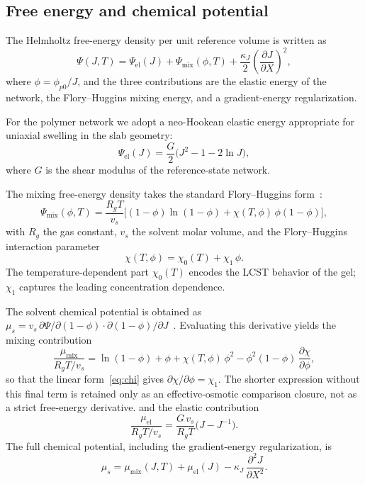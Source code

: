 \documentclass[11pt]{article}
\newcommand{\pp}{\phi_{p0}}
\begin{document}
\subsection{Free energy and chemical potential}

The Helmholtz free-energy density per unit reference volume is written as
\begin{equation}
  \Psi(J,T) = \Psi_\mathrm{el}(J) + \Psi_\mathrm{mix}(\phi,T)
  + \frac{\kappa_J}{2}\left(\frac{\partial J}{\partial X}\right)^2,
  \label{eq:Psi}
\end{equation}
where $\phi = \pp/J$, and the three contributions are the elastic
energy of the network, the Flory--Huggins mixing energy, and a
gradient-energy regularization.

For the polymer network we adopt a neo-Hookean elastic energy
appropriate for uniaxial swelling in the slab geometry:
\begin{equation}
  \Psi_\mathrm{el}(J) = \frac{G}{2}
  \bigl(J^{2} - 1 - 2\ln J\bigr),
  \label{eq:Psi_el}
\end{equation}
where $G$ is the shear modulus of the reference-state network.

The mixing free-energy density takes the standard Flory--Huggins
form~\cite{Flory1953}:
\begin{equation}
  \Psi_\mathrm{mix}(\phi,T)
  = \frac{R_g T}{v_s}
  \Big[(1-\phi)\ln(1-\phi) + \chi(T,\phi)\,\phi(1-\phi)\Big],
  \label{eq:Psi_mix}
\end{equation}
with $R_g$ the gas constant, $v_s$ the solvent molar volume, and
the Flory--Huggins interaction parameter
\begin{equation}
  \chi(T,\phi) = \chi_0(T) + \chi_1\,\phi.
  \label{eq:chi}
\end{equation}
The temperature-dependent part $\chi_0(T)$ encodes the LCST
behavior of the gel; $\chi_1$ captures the leading
concentration dependence.

The solvent chemical potential is obtained as
$\mu_s = v_s\,\partial\Psi/\partial(1-\phi)\cdot
\partial(1-\phi)/\partial J$~\cite{Hong2008}.  Evaluating this
derivative yields the mixing contribution
\begin{equation}
  \frac{\mu_\mathrm{mix}}{R_g T/v_s}
  = \ln(1-\phi) + \phi + \chi(T,\phi)\,\phi^2
  - \phi^2(1-\phi)\,\frac{\partial\chi}{\partial\phi},
  \label{eq:mu_mix}
\end{equation}
so that the linear form~\eqref{eq:chi} gives
$\partial\chi/\partial\phi=\chi_1$.  The shorter expression without
this final term is retained only as an effective-osmotic comparison
closure, not as a strict free-energy derivative.
and the elastic contribution
\begin{equation}
  \frac{\mu_\mathrm{el}}{R_g T/v_s}
  = \frac{G\,v_s}{R_g T}
  \bigl(J - J^{-1}\bigr).
  \label{eq:mu_el}
\end{equation}
The full chemical potential, including the gradient-energy
regularization, is
\begin{equation}
  \mu_s = \mu_\mathrm{mix}(J,T) + \mu_\mathrm{el}(J)
  - \kappa_J\,\frac{\partial^2 J}{\partial X^2}.
  \label{eq:mu_s}
\end{equation}
\end{document}

